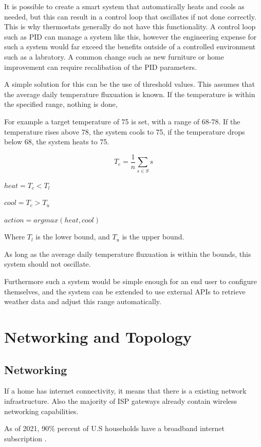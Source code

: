\documentclass[10pt, journal]{IEEEtran} %
\begin{document}
It is possible to create a smart system that automatically heats and cools as needed,
but this can result in a control loop that oscillates if not done correctly.
This is why thermostats generally do not have this functionality.
A control loop such as PID can manage a system like this,
however the engineering expense for such a system would far exceed the benefits 
outside of a controlled environment such as a labratory.
A common change such as new furniture or home improvement
can require recalibation of the PID parameters.

A simple solution for this can be the use of threshold values.
This assumes that the average daily temperature fluxuation is known.
If the temperature is within the specified range, nothing is done,

For example a target temperature of 75 is set, with a range of 68-78.
If the temperature rises above 78, the system cools to 75,
if the temperature drops below 68, the system heats to 75.

\[
T_c = \frac{1}{n}\sum_{s \in S}{s}
\]

$heat = T_c < T_l$

$cool = T_c > T_u$

$action = argmax(heat, cool)$

\smallskip

Where $T_l$ is the lower bound, and $T_u$ is the upper bound.

\bigskip

As long as the average daily temperature fluxuation is within the bounds,
this system should not oscillate.

Furthermore such a system would be simple enough for an end user to configure themselves,
and the system can be extended to use external APIs to retrieve weather data 
and adjust this range automatically.

\section{Networking and Topology}

\subsection{Networking}

If a home has internet connectivity, it means that there is a existing network infrastructure.
Also the majority of ISP gateways already contain wireless networking capabilities.

As of 2021, 90\% percent of U.S households have a broadband internet subscription \cite{censusgov}.
\end{document}
